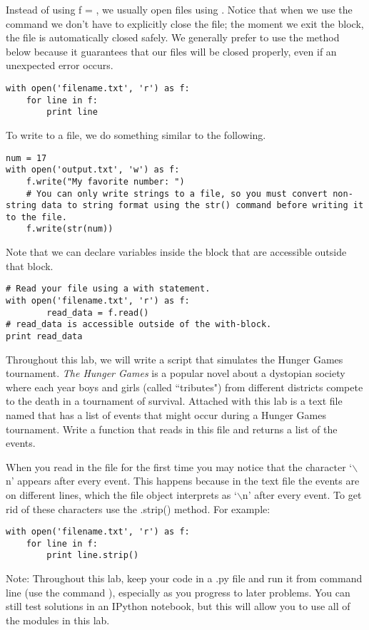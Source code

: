 Instead of using f = , we usually open files using .
Notice that when we use the  command we don't have to explicitly close the file;
the moment we exit the  block, the file is automatically closed safely.
We generally prefer to use the method below because it guarantees that our files will be closed properly, even if an unexpected error occurs.
\begin{lstlisting}
with open('filename.txt', 'r') as f:
    for line in f:
        print line
\end{lstlisting}

To write to a file, we do something similar to the following.
\begin{lstlisting}
num = 17
with open('output.txt', 'w') as f:
    f.write("My favorite number: ")
    # You can only write strings to a file, so you must convert non-string data to string format using the str() command before writing it to the file.
    f.write(str(num))
\end{lstlisting}

Note that we can declare variables inside the  block that are accessible outside that block.
\begin{lstlisting}
# Read your file using a with statement.
with open('filename.txt', 'r') as f:
        read_data = f.read()
# read_data is accessible outside of the with-block.
print read_data
\end{lstlisting}

\begin{problem}
Throughout this lab, we will write a script that simulates the Hunger Games tournament. \emph{The Hunger Games} is a popular novel about a dystopian society where each year boys and girls (called ``tributes") from different districts compete to the death in a tournament of survival. Attached with this lab is a text file named  that has a list of events that might occur during a Hunger Games tournament. Write a function that reads in this file and returns a list of the events.

When you read in the file for the first time you may notice that the character `$\backslash$n' appears after every event. This happens because in the text file the events are on different lines, which the file object interprets as `$\backslash$n' after every event. To get rid of these characters use the .strip() method. For example:

\begin{lstlisting}
with open('filename.txt', 'r') as f:
    for line in f:
        print line.strip()
\end{lstlisting}

Note: Throughout this lab, keep your code in a .py file and run it from command line (use the command ), especially as you progress to later problems. You can still test solutions in an IPython notebook, but this will allow you to use all of the modules in this lab. 

\end{problem}

